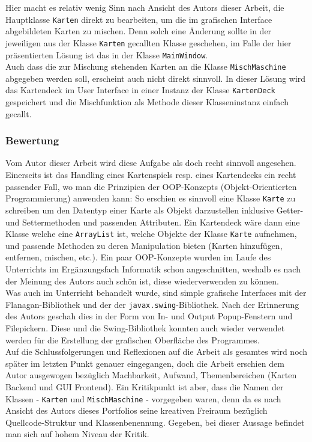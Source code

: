 \documentclass[a4paper,11pt]{article}
\begin{document}
Hier macht es relativ wenig Sinn nach Ansicht des Autors dieser Arbeit, die Hauptklasse \texttt{Karten} direkt zu bearbeiten, um die im grafischen Interface abgebildeten Karten zu mischen. Denn solch eine Änderung sollte in der jeweiligen aus der Klasse \texttt{Karten} gecallten Klasse geschehen, im Falle der hier präsentierten Lösung ist das in der Klasse \texttt{MainWindow}.\\

Auch dass die zur Mischung stehenden Karten an die Klasse \texttt{MischMaschine} abgegeben werden soll, erscheint auch nicht direkt sinnvoll. In dieser Lösung wird das Kartendeck im User Interface in einer Instanz der Klasse \texttt{KartenDeck} gespeichert und die Mischfunktion als Methode dieser Klasseninstanz einfach gecallt.



\subsubsection{Bewertung}
Vom Autor dieser Arbeit wird diese Aufgabe als doch recht sinnvoll angesehen. Einerseits ist das Handling eines Kartenspiels resp. eines Kartendecks ein recht passender Fall, wo man die Prinzipien der OOP-Konzepts (Objekt-Orientierten Programmierung) anwenden kann: So erschien es sinnvoll eine Klasse \texttt{Karte} zu schreiben um den Datentyp einer Karte als Objekt darzustellen inklusive Getter- und Settermethoden und passenden Attributen. Ein Kartendeck wäre dann eine Klasse welche eine \texttt{ArrayList} ist, welche Objekte der Klasse \texttt{Karte} aufnehmen, und passende Methoden zu deren Manipulation bieten (Karten hinzufügen, entfernen, mischen, etc.). Ein paar OOP-Konzepte wurden im Laufe des Unterrichts im Ergänzungsfach Informatik schon angeschnitten, weshalb es nach der Meinung des Autors auch schön ist, diese wiederverwenden zu können. \\

Was auch im Unterricht behandelt wurde, sind simple grafische Interfaces mit der Flanagan-Bibliothek und der der \texttt{javax.swing}-Bibliothek. Nach der Erinnerung des Autors geschah dies in der Form von In- und Output Popup-Fenstern und Filepickern. Diese und die Swing-Bibliothek konnten auch wieder verwendet werden für die Erstellung der grafischen Oberfläche des Programmes.\\

Auf die Schlussfolgerungen und Reflexionen auf die Arbeit als gesamtes wird noch später im letzten Punkt genauer eingegangen, doch die Arbeit erschien dem Autor ausgewogen bezüglich Machbarkeit, Aufwand, Themenbereichen (Karten Backend und GUI Frontend). Ein Kritikpunkt ist aber, dass die Namen der Klassen - \texttt{Karten} und \texttt{MischMaschine} - vorgegeben waren, denn da es nach Ansicht des Autors dieses Portfolios seine kreativen Freiraum bezüglich Quellcode-Struktur und Klassenbenennung. Gegeben, bei dieser Aussage befindet man sich auf hohem Niveau der Kritik.
\end{document}
